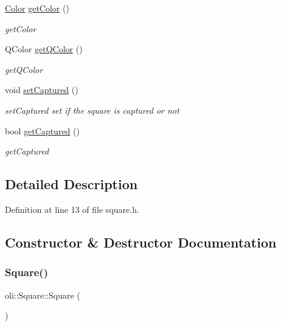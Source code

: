 \begin{DoxyCompactItemize}
\hyperlink{namespaceoli_aac44697e43b3ab2ad32fe892ab2276eb}{Color} \hyperlink{classoli_1_1_square_a7709b35684fb5754e53d138bb916880c}{get\+Color} ()
\begin{DoxyCompactList}\small\item\em get\+Color \end{DoxyCompactList}\item 
Q\+Color \hyperlink{classoli_1_1_square_aff2077d95454b98d160c587f13eb10e7}{get\+Q\+Color} ()
\begin{DoxyCompactList}\small\item\em get\+Q\+Color \end{DoxyCompactList}\item 
void \hyperlink{classoli_1_1_square_a1c2449cd8855586cd63d6bde60873ce5}{set\+Captured} ()
\begin{DoxyCompactList}\small\item\em set\+Captured set if the square is captured or not \end{DoxyCompactList}\item 
bool \hyperlink{classoli_1_1_square_aa8ed3521a370df288e9085222660d7ea}{get\+Captured} ()
\begin{DoxyCompactList}\small\item\em get\+Captured \end{DoxyCompactList}\end{DoxyCompactItemize}


\subsection{Detailed Description}


Definition at line 13 of file square.\+h.



\subsection{Constructor \& Destructor Documentation}
\hypertarget{classoli_1_1_square_acc031fb00b69ad310d63985481b60ba6}{}\label{classoli_1_1_square_acc031fb00b69ad310d63985481b60ba6} 
\subsubsection{\texorpdfstring{Square()}{Square()}\hspace{0.1cm}{\footnotesize\ttfamily [1/3]}}
{\footnotesize\ttfamily oli\+::\+Square\+::\+Square (\begin{DoxyParamCaption}{ }\end{DoxyParamCaption})}



